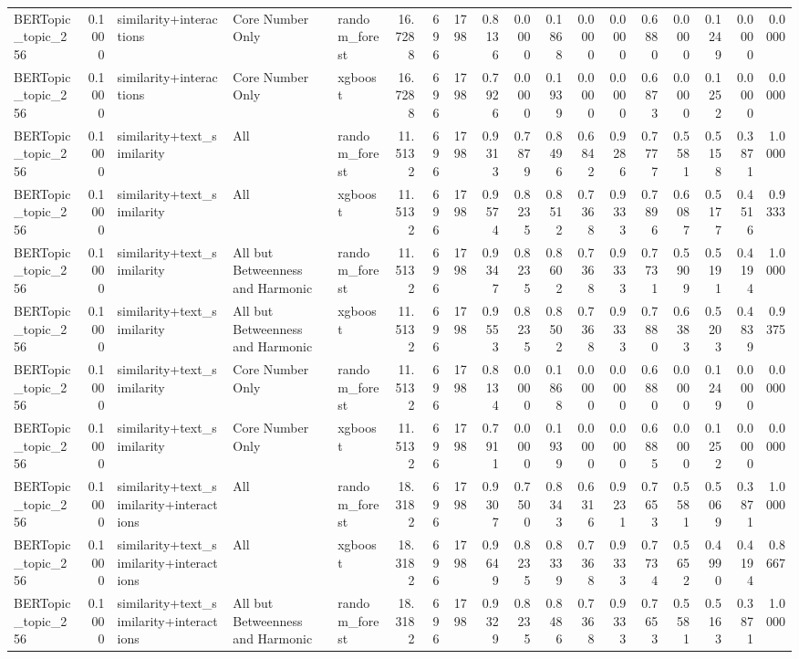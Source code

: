 \begin{tabular}{lrlllrrrrrrrrrrrrr}
BERTopic_topic_256 & 0.1000 & similarity+interactions & Core Number Only & random_forest & 16.7288 & 696 & 1798 & 0.8136 & 0.0000 & 0.1868 & 0.0000 & 0.0000 & 0.6880 & 0.0000 & 0.1249 & 0.0000 & 0.0000 \\
BERTopic_topic_256 & 0.1000 & similarity+interactions & Core Number Only & xgboost & 16.7288 & 696 & 1798 & 0.7926 & 0.0000 & 0.1939 & 0.0000 & 0.0000 & 0.6873 & 0.0000 & 0.1252 & 0.0000 & 0.0000 \\
BERTopic_topic_256 & 0.1000 & similarity+text_similarity & All & random_forest & 11.5132 & 696 & 1798 & 0.9313 & 0.7879 & 0.8496 & 0.6842 & 0.9286 & 0.7777 & 0.5581 & 0.5158 & 0.3871 & 1.0000 \\
BERTopic_topic_256 & 0.1000 & similarity+text_similarity & All & xgboost & 11.5132 & 696 & 1798 & 0.9574 & 0.8235 & 0.8512 & 0.7368 & 0.9333 & 0.7896 & 0.6087 & 0.5177 & 0.4516 & 0.9333 \\
BERTopic_topic_256 & 0.1000 & similarity+text_similarity & All but Betweenness and Harmonic & random_forest & 11.5132 & 696 & 1798 & 0.9347 & 0.8235 & 0.8602 & 0.7368 & 0.9333 & 0.7731 & 0.5909 & 0.5191 & 0.4194 & 1.0000 \\
BERTopic_topic_256 & 0.1000 & similarity+text_similarity & All but Betweenness and Harmonic & xgboost & 11.5132 & 696 & 1798 & 0.9553 & 0.8235 & 0.8502 & 0.7368 & 0.9333 & 0.7880 & 0.6383 & 0.5203 & 0.4839 & 0.9375 \\
BERTopic_topic_256 & 0.1000 & similarity+text_similarity & Core Number Only & random_forest & 11.5132 & 696 & 1798 & 0.8134 & 0.0000 & 0.1868 & 0.0000 & 0.0000 & 0.6880 & 0.0000 & 0.1249 & 0.0000 & 0.0000 \\
BERTopic_topic_256 & 0.1000 & similarity+text_similarity & Core Number Only & xgboost & 11.5132 & 696 & 1798 & 0.7911 & 0.0000 & 0.1939 & 0.0000 & 0.0000 & 0.6885 & 0.0000 & 0.1252 & 0.0000 & 0.0000 \\
BERTopic_topic_256 & 0.1000 & similarity+text_similarity+interactions & All & random_forest & 18.3182 & 696 & 1798 & 0.9307 & 0.7500 & 0.8343 & 0.6316 & 0.9231 & 0.7653 & 0.5581 & 0.5069 & 0.3871 & 1.0000 \\
BERTopic_topic_256 & 0.1000 & similarity+text_similarity+interactions & All & xgboost & 18.3182 & 696 & 1798 & 0.9649 & 0.8235 & 0.8339 & 0.7368 & 0.9333 & 0.7734 & 0.5652 & 0.4990 & 0.4194 & 0.8667 \\
BERTopic_topic_256 & 0.1000 & similarity+text_similarity+interactions & All but Betweenness and Harmonic & random_forest & 18.3182 & 696 & 1798 & 0.9329 & 0.8235 & 0.8486 & 0.7368 & 0.9333 & 0.7653 & 0.5581 & 0.5163 & 0.3871 & 1.0000 \\

\end{tabular}
